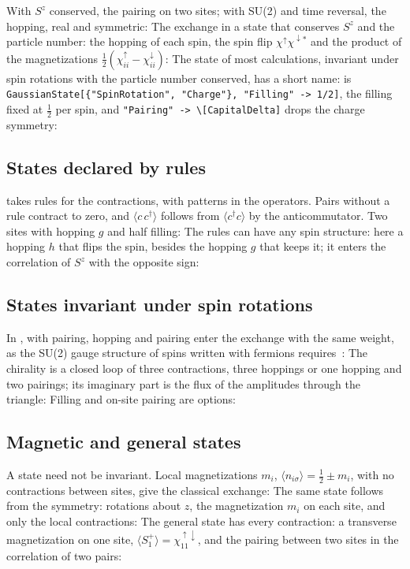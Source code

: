 \documentclass[11pt,a4paper]{article}
\begin{document}
With $S^z$ conserved, the pairing on two sites; with SU(2) and time reversal, the hopping, real and symmetric:
The exchange in a state that conserves $S^z$ and the particle number: the hopping of each spin, the spin flip
$\chi^\uparrow\chi^{\downarrow\ast}$ and the product of the magnetizations $\frac12(\chi^\uparrow_{ii}-\chi^\downarrow_{ii})$:
The state of most calculations, invariant under spin rotations with the particle number conserved, has a short name:
 is \texttt{GaussianState[\{"SpinRotation", "Charge"\}, "Filling" -> 1/2]}, the filling fixed at
$\frac12$ per spin, and \texttt{"Pairing" -> \textbackslash[CapitalDelta]} drops the charge symmetry:

\subsection{States declared by rules}
 takes rules for the contractions, with patterns in the operators. Pairs without a rule contract to
zero, and $\langle c\,c^\dagger\rangle$ follows from $\langle c^\dagger c\rangle$ by the anticommutator. Two sites with
hopping $g$ and half filling:
The rules can have any spin structure: here a hopping $h$ that flips the spin, besides the hopping $g$ that keeps it;
it enters the correlation of $S^z$ with the opposite sign:

\subsection{States invariant under spin rotations}
In , with pairing, hopping and pairing enter the exchange with the same weight, as the SU(2) gauge
structure of spins written with fermions requires~\cite{AZHA88}:
The chirality is a closed loop of three contractions, three hoppings or one hopping and two pairings; its imaginary part is
the flux of the amplitudes through the triangle:
Filling and on-site pairing are options:

\subsection{Magnetic and general states}
A state need not be invariant. Local magnetizations $m_i$, $\langle n_{i\sigma}\rangle=\frac12\pm m_i$, with no
contractions between sites, give the classical exchange:
The same state follows from the symmetry: rotations about $z$, the magnetization $m_i$ on each site, and only the local
contractions:
The general state has every contraction: a transverse magnetization on one site, $\langle S^+_1\rangle=\chi^{\uparrow\downarrow}_{11}$,
and the pairing between two sites in the correlation of two pairs:
\end{document}
